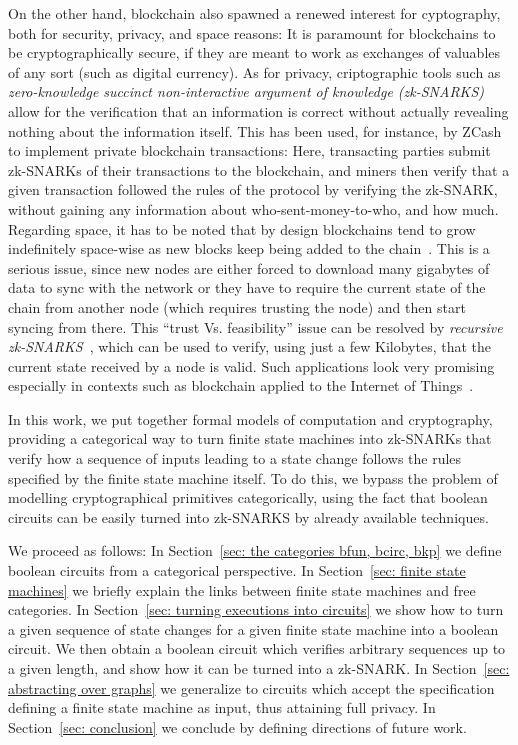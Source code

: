 \documentclass[preliminary,copyright,creativecommons,sharealike,noncommercial]{eptcs}
\begin{document}
On the other hand, blockchain also spawned a renewed interest for 
cyptography, both for security, privacy, and space reasons: It is 
paramount for blockchains to be cryptographically secure, if they are 
meant to work as exchanges of valuables of any sort (such as digital currency).
As for privacy, criptographic tools such as \emph{zero-knowledge 
succinct non-interactive argument of knowledge (zk-SNARKS)}~\cite{Ben-Sasson2013} allow for 
the verification that an information is correct without actually revealing nothing 
about the information itself. This has been used, for instance, by ZCash~\cite{Hopwood2019} to 
implement private blockchain transactions: Here, transacting parties submit 
zk-SNARKs of their transactions to the blockchain, and miners then verify that a given 
transaction followed the rules of the protocol by verifying the zk-SNARK, 
without gaining any information about who-sent-money-to-who, and 
how much. 
Regarding space, it has to be noted that by design blockchains tend to 
grow indefinitely space-wise as new blocks keep being added to the chain~\cite{MacManus2018}. 
This is a serious issue, since new nodes are either forced to download many 
gigabytes of data to sync with the network or they have to require the current state 
of the chain from another node (which requires trusting the node) and then start 
syncing from there. This ``trust Vs. feasibility'' issue can be resolved by \emph{recursive 
zk-SNARKS}~\cite{Ben-Sasson2017}, which can be used to verify, using just a few Kilobytes, that the current 
state received by a node is valid. Such applications look very promising especially in 
contexts such as blockchain applied to the Internet of Things~\cite{Leiba2018}.

In this work, we put together formal models of computation and 
cryptography, providing a categorical way to turn finite state machines into zk-SNARKs 
that verify how a sequence of inputs leading to a state change follows the 
rules specified by the finite state machine itself. To do this, we bypass the problem 
of modelling cryptographical primitives categorically, using the 
fact that boolean circuits can be easily turned into zk-SNARKS by already 
available techniques. 

We proceed as follows: In Section~\ref{sec: the categories bfun, bcirc, bkp} we 
define boolean circuits from a categorical perspective. 
In Section~\ref{sec: finite state machines} we briefly 
explain the links between finite state machines and free categories. 
In Section~\ref{sec: turning executions into circuits} 
we show how to turn a given sequence of state changes 
for a given finite state machine into a boolean circuit. We then obtain a 
boolean circuit which verifies arbitrary sequences up to 
a given length, and show how it can be turned into a zk-SNARK. 
In Section~\ref{sec: abstracting over graphs} we generalize to 
circuits which accept the specification defining a finite state machine 
as input, thus attaining full privacy. In Section~\ref{sec: conclusion} 
we conclude by defining directions of future work.
\end{document}
